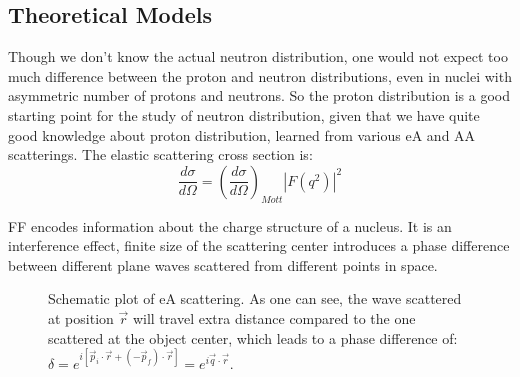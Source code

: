 
\subsection{Theoretical Models} 
\label{subsec:models}
Though we don't know the actual neutron distribution, one would not expect too
much difference between the proton and neutron distributions, even in nuclei with
asymmetric number of protons and neutrons. So the proton distribution is a good
starting point for the study of neutron distribution, given that we have quite
good knowledge about proton distribution, learned from various eA and AA scatterings. 
The elastic scattering cross section is:
\begin{equation}
    \frac{d\sigma}{d\Omega} = \left( \frac{d\sigma}{d\Omega} \right)_{Mott} |F(q^2)|^2
\end{equation}

FF encodes information about the charge structure of a nucleus. It is an interference
effect, finite size of the scattering center introduces a phase difference between
different plane waves scattered from different points in space.
\begin{figure}
    \centering
    \caption{Schematic plot of eA scattering. As one can see, the wave scattered
    at position $\vec{r}$ will travel extra distance compared to the one scattered
    at the object center, which leads to a phase difference of:
    $\delta = e^{i[\vec{p}_i \cdot \vec{r} + (-\vec{p}_f) \cdot \vec{r}]} = e^{i\vec{q}\cdot\vec{r}}$.
    }
    \label{fig:FF_phase_diff}
\end{figure}

